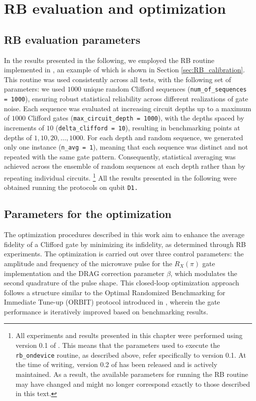 \section{RB evaluation and optimization}

\subsection{RB evaluation parameters}\label{sec:RB_parameters}
In the results presented in the following, we employed the RB routine implemented in \Qibocal, an example of which is shown in Section \ref{sec:RB_calibration}. 
This routine was used consistently across all tests, with the following set of parameters: we used $1000$ unique random Clifford sequences (\texttt{num\_of\_sequences = 1000}), ensuring robust statistical reliability across different realizations of gate noise. 
Each sequence was evaluated at increasing circuit depths up to a maximum of $1000$ Clifford gates (\texttt{max\_circuit\_depth = 1000}), with the depths spaced by increments of $10$ (\texttt{delta\_clifford = 10}), resulting in benchmarking points at depths of $1, 10, 20, \ldots, 1000$. 
For each depth and random sequence, we generated only one instance (\texttt{n\_avg = 1}), meaning that each sequence was distinct and not repeated with the same gate pattern. 
Consequently, statistical averaging was achieved across the ensemble of random sequences at each depth rather than by repeating individual circuits. 
\footnote{All experiments and results presented in this chapter were performed using version 0.1 of \Qibocal. This means that the parameters used to execute the \texttt{rb\_ondevice} routine, as described above, refer specifically to version 0.1. At the time of writing, version 0.2 of \Qibocal has been released and is actively maintained. As a result, the available parameters for running the RB routine may have changed and might no longer correspond exactly to those described in this text.}
All the results presented in the following were obtained running the protocols on qubit \tt{D1}.

\subsection{Parameters for the optimization}
The optimization procedures described in this work aim to enhance the average fidelity of a Clifford gate by minimizing its infidelity, as determined through RB experiments. 
The optimization is carried out over three control parameters: the amplitude and frequency of the microwave pulse for the $R_X(\pi)$ gate implementation and the DRAG correction parameter $\beta$, which modulates the second quadrature of the pulse shape. 
This closed-loop optimization approach follows a structure similar to the Optimal Randomized Benchmarking for Immediate Tune-up (ORBIT) protocol introduced in \cite{kelly_optimal_2014}, wherein the gate performance is iteratively improved based on benchmarking results.

